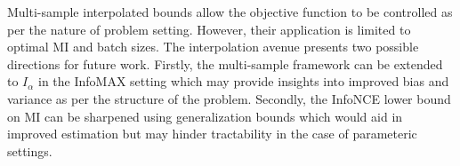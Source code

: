 \documentclass[11pt,letterpaper]{article}
\begin{document}
Multi-sample interpolated bounds allow the objective function to be controlled as per the nature of problem setting. However, their application is limited to optimal MI and batch sizes. The interpolation avenue presents two possible directions for future work. Firstly, the multi-sample framework can be extended to $I_{\alpha}$ in the InfoMAX setting which may provide insights into improved bias and variance as per the structure of the problem. Secondly, the InfoNCE lower bound on MI can be sharpened using generalization bounds which would aid in improved estimation but may hinder tractability in the case of parameteric settings. 
\end{document}
